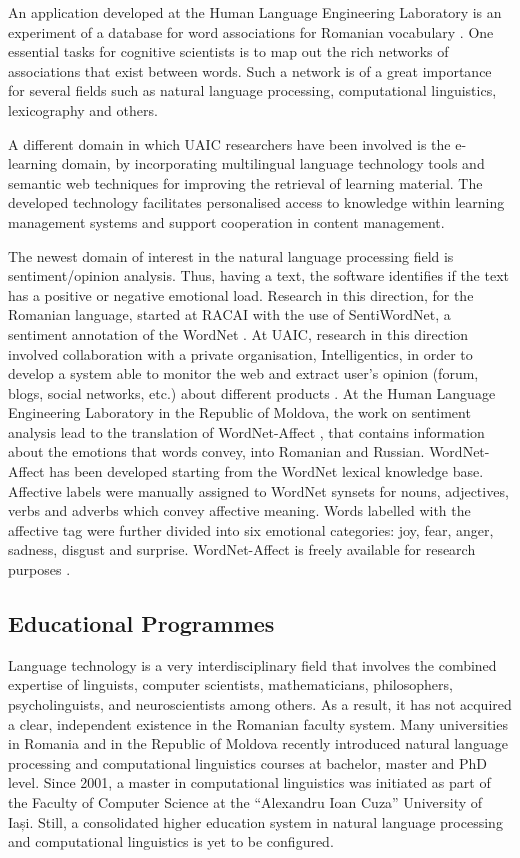 \begin{multicols}{2}
An application developed at the Human Language Engineering Laboratory is an experiment of a database for word associations for Romanian vocabulary \cite{sem_dict}. One essential tasks for cognitive scientists is to map out the rich networks of associations that exist between words. Such a network is of a great importance for several fields such as natural language processing, computational linguistics, lexicography and others.

A different domain in which UAIC researchers have been involved is the e-learning domain, by incorporating multilingual language technology tools and semantic web techniques for improving the retrieval of learning material. The developed technology facilitates personalised access to knowledge within learning management systems and support cooperation in content management.

The newest domain of interest in the natural language processing field is sentiment/opinion analysis. Thus, having a text, the software identifies if the text has a positive or negative emotional load. Research in this direction, for the Romanian language, started at RACAI with the use of SentiWordNet, a sentiment annotation of the WordNet \cite{sentiwn}. At UAIC, research in this direction involved collaboration with a private organisation, Intelligentics, in order to develop a system able to monitor the web and extract user’s opinion (forum, blogs, social networks, etc.) about different products \cite{sentimatrix}. At the Human Language Engineering Laboratory in the Republic of Moldova, the work on sentiment analysis lead to the translation of WordNet-Affect \cite{senti_md}, that contains information about the emotions that words convey, into Romanian and Russian. WordNet-Affect has been developed starting from the WordNet lexical knowledge base. Affective labels were manually assigned to WordNet synsets for nouns, adjectives, verbs and adverbs which convey affective meaning. Words labelled with the affective tag were further divided into six emotional categories: joy, fear, anger, sadness, disgust and surprise. WordNet-Affect is freely available for research purposes \cite{wndom}.

\subsection{Educational Programmes}

Language technology is a very interdisciplinary field that involves the combined expertise of linguists, computer scientists, mathematicians, philosophers, psycholinguists, and neuroscientists among others. As a result, it has not acquired a clear, independent existence in the Romanian faculty system. Many universities in Romania and in the Republic of Moldova recently introduced natural language processing and computational linguistics courses at bachelor, master and PhD level. Since 2001, a master in computational linguistics was initiated as part of the Faculty of Computer Science at the “Alexandru Ioan Cuza” University of Iași. Still, a consolidated higher education system in natural language processing and computational linguistics is yet to be configured.


\end{multicols}
